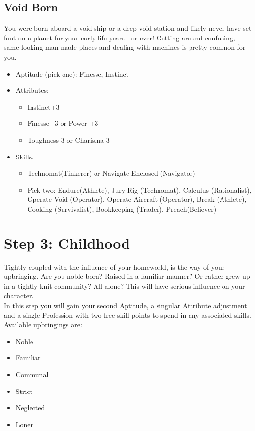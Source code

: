 \subsection{Void Born}
You were born aboard a void ship or a deep void station and likely never have set foot on a planet for your early life years - or ever! Getting around confusing, same-looking man-made places and dealing with machines is pretty common for you.
\begin{itemize}
	\item Aptitude (pick one): Finesse, Instinct
	\item Attributes:
	\begin{itemize}
		\item Instinct+3
		\item Finesse+3 or Power +3
		\item Toughness-3 or Charisma-3
	\end{itemize}
	\item Skills: 
	\begin{itemize}
	 	\item Technomat(Tinkerer) or Navigate Enclosed (Navigator)
	 	\item Pick two: Endure(Athlete), Jury Rig (Technomat), Calculus (Rationalist), Operate Void (Operator), Operate Aircraft (Operator), Break (Athlete), Cooking (Survivalist), Bookkeeping (Trader), Preach(Believer)
	 \end{itemize} 
\end{itemize}


\section{Step 3: Childhood} %
\label{sec:lifepath_3_childhood}
Tightly coupled with the influence of your homeworld, is the way of your upbringing. Are you noble born? Raised in a familiar manner? Or rather grew up in a tightly knit community? All alone? This will have serious influence on your character.\\
In this step you will gain your second Aptitude, a singular Attribute adjustment and a single Profession with two free skill points to spend in any associated skills. Available upbringings are:
\begin{itemize}
	\item Noble
	\item Familiar
	\item Communal
	\item Strict
	\item Neglected
	\item Loner
\end{itemize}

